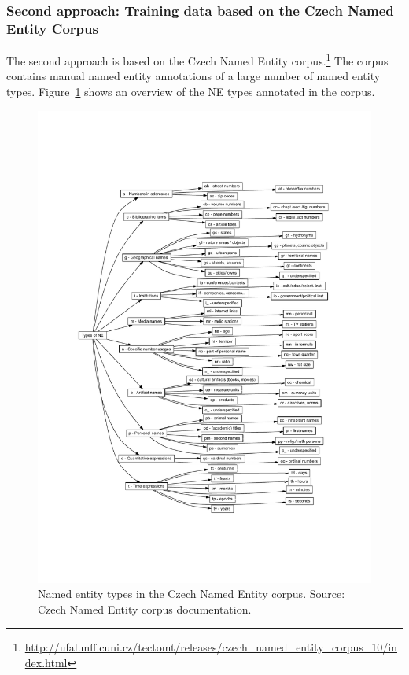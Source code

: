 \subsubsection*{Second approach: Training data based on the Czech Named Entity Corpus}

The second approach is based on the Czech Named Entity corpus.\footnote{\url{http://ufal.mff.cuni.cz/tectomt/releases/czech_named_entity_corpus_10/index.html}}
The corpus contains manual named entity annotations of a large number of named entity types. Figure~\ref{fig:figures_core_CzechNECorpus}
shows an overview of the NE types annotated in the corpus.


\begin{figure}[h!]
	\centering
		\includegraphics[width=16
		 cm]{figures/core/CzechNECorpus.pdf}
	\caption{Named entity types in the Czech Named Entity corpus. Source: Czech Named Entity corpus documentation.}
	\label{fig:figures_core_CzechNECorpus}
\end{figure}


